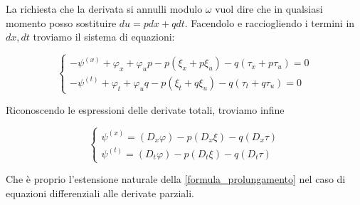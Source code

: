 \documentclass{report}
\begin{document}
La richiesta che la derivata si annulli modulo $\omega$ vuol dire che in qualsiasi momento posso sostituire $du = pdx + qdt$. Facendolo e racciogliendo i termini in $dx, dt$ troviamo il sistema di equazioni: 

\[\begin{cases}
    -\psi^{(x)} +\varphi_x + \varphi_up -p(\xi_x +p\xi_u) - q(\tau_x + p\tau_u) = 0 \\
    -\psi^{(t)} +\varphi_t + \varphi_uq -p(\xi_t +q\xi_u) - q(\tau_t + q\tau_u) = 0
\end{cases}\]

Riconoscendo le espressioni delle derivate totali, troviamo infine 

\begin{tcolorbox}[colback=doc!10, colframe=black, boxrule=1pt]
\[\begin{cases}
    \psi^{(x)} = (D_x\varphi) - p(D_x\xi) - q(D_x\tau) \\
    \psi^{(t)} = (D_t\varphi) -p(D_t\xi) -q(D_t\tau)
\end{cases}\]
\end{tcolorbox}

Che è proprio l'estensione naturale della \ref{formula_prolungamento} nel caso di equazioni differenziali alle derivate parziali. 
\end{document}
